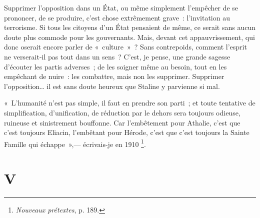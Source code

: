 \documentclass[french,twoside]{book} %
\newcommand{\astermono}{\medskip\centerline{\color{rubric}\large\selectfont{\syms ✻}}\medskip\par}%
\newcommand\chapteropen{} %
\newcommand\chapterclose{} %
\begin{document}
\astermono

\noindent Supprimer l’opposition dans un État, ou même simplement l’empêcher de se prononcer, de se produire, c’est chose extrêmement grave : l’invitation au terrorisme. Si tous les citoyens d’un État pensaient de même, ce serait sans aucun doute plus commode pour les gouvernants. Mais, devant cet appauvrissement, qui donc oserait encore parler de « culture » ? Sans contrepoids, comment l’esprit ne verserait-il pas tout dans un sens ? C’est, je pense, une grande sagesse d’écouter les partis adverses ; de les soigner même au besoin, tout en les empêchant de nuire : les combattre, mais non les supprimer. Supprimer l’opposition… il est sans doute heureux que Staline y parvienne si mal.\par
« L’humanité n’est pas simple, il faut en prendre son parti ; et toute tentative de simplification, d’unification, de réduction par le dehors sera toujours odieuse, ruineuse et sinistrement bouffonne. Car l’embêtement pour Athalie, c’est que c’est toujours Eliacin, l’embêtant pour Hérode, c’est que c’est toujours la Sainte Famille qui échappe »,— écrivais-je en 1910 \footnote{\emph{Nouveaux prétextes}, p. 189.}.
\chapterclose


\chapteropen

\chapter[{V}]{V}
\renewcommand{\leftmark}{V}
\end{document}
